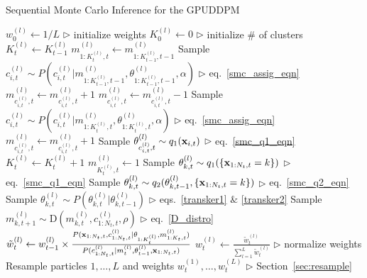 \documentclass[twocolumn, final]{svjour3}
\begin{document}
\begin{algorithm*}[!]
\caption{Sequential Monte Carlo Inference for the GPUDDPM}
\label{alg:SMC}
\begin{algorithmic}[1]
\STATE $w_{0}^{(l)} \leftarrow 1/L$ \hfill $\triangleright$ initialize weights
\ENDFOR
\STATE $K_{0}^{(l)} \leftarrow 0$ \hfill $\triangleright$ initialize \# of clusters
\STATE $K_{t}^{(l)}  \leftarrow K_{t-1}^{(l)}$
\STATE $m_{1:K_{t}^{(l)}, t}^{(l)} \leftarrow m_{1:K_{t-1}^{(l)}, t-1}^{(l)}$
\STATE Sample $c_{i,t}^{(l)} \sim P \left( c_{i,t}^{(l)} | m_{1:K_{t-1}^{(l)}, t-1}^{(l)}, \theta_{1:K_{t-1}^{(l)}, t-1}^{(l)}, \alpha \right)$  \hfill $\triangleright$ eq.~\eqref{smc_assig_eqn}
\STATE $m_{c_{i,t}^{(l)},t}^{(l)} \leftarrow m_{c_{i,t}^{(l)},t}^{(l)} + 1$
\ELSE
\STATE $m_{c_{i,t}^{(l)},t}^{(l)} \leftarrow m_{c_{i,t}^{(l)},t}^{(l)} - 1$
\STATE Sample $c_{i,t}^{(l)} \sim P \left( c_{i,t}^{(l)} | m_{1:K_{t}^{(l)}, t}^{(l)}, \theta_{1:K_{t}^{(l)}, t}^{(l)}, \alpha \right)$  \hfill $\triangleright$ eq.~\eqref{smc_assig_eqn}
\STATE $m_{c_{i,t}^{(l)},t}^{(l)} \leftarrow m_{c_{i,t}^{(l)},t}^{(l)} + 1$
\ENDIF
{}
\STATE Sample $\theta_{c_{i,t}^{(l)}, t}^{(l)} \sim q_{1}(\bold{x}_{i,t})$ \hfill $\triangleright$ eq.~\eqref{smc_q1_eqn}
\STATE $K_{t}^{(l)} \leftarrow K_{t}^{(l)} + 1$
\STATE $m_{K_{t}^{(l)},t}^{(l)} \leftarrow 1$
\ENDIF
\ENDFOR
{}
\STATE Sample $\theta_{k,t}^{(l)} \sim q_{1}(\{ \bold{x}_{1:N_{t}, t} = k \})$  \hfill $\triangleright$ eq.~\eqref{smc_q1_eqn}
\STATE Sample $\theta_{k,t}^{(l)} \sim q_{2}(\theta_{k,t-1}^{(l)}, \{ \bold{x}_{1:N_{t}, t} = k \})$  \hfill $\triangleright$ eq.~\eqref{smc_q2_eqn}
\STATE Sample $\theta_{k,t}^{(l)} \sim P(\theta_{k,t}^{(l)} | \theta_{k,t-1}^{(l)})$  \hfill $\triangleright$ eqs.~\eqref{transker1} $\&$ \eqref{transker2}
\ENDIF
{}
\STATE Sample $m_{k,t+1}^{(l)} \sim \text{D}(m_{k,t}^{(l)}, c_{1:N_{t}, t}^{(l)}, \rho)$  \hfill $\triangleright$ eq.~\eqref{D_distro}
\ENDIF
\ENDFOR
\ENDFOR
\STATE $\tilde{w}_{t}^{(l)} \leftarrow w_{t-1}^{(l)} \times \frac{ P(\bold{x}_{1:N_{t},t}, c_{1:N_{t}, t}^{(l)} | \theta_{1:K_{t}^{(l)}}, m_{1:K_{t},t}^{(l)})} {P(c_{1:N_{t}, t}^{(l)} | m_{t}^{(l)}, \theta_{t-1}^{(l)}, \bold{x}_{1:N_{t},t} ) } $
\ENDFOR
{}
\STATE $w_{t}^{(l)} \leftarrow \frac{\tilde{w}_{t}^{(l)}}{\sum_{l=1}^{L} \tilde{w}_{t}^{(l)} }$   \hfill $\triangleright$ normalize weights
\ENDFOR
\STATE Resample particles $1, \ldots, L$ and weights $w_{t}^{(1)}, \ldots, w_{t}^{(L)}$   \hfill $\triangleright$ Section~\ref{sec:resample}
\ENDFOR
\end{algorithmic}
\end{algorithm*}
\end{document}
